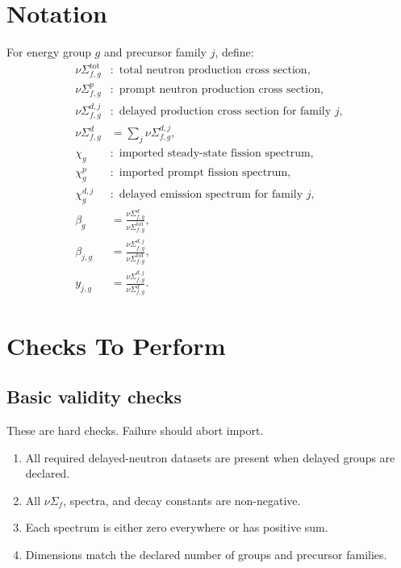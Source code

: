 \documentclass[11pt]{article}
\begin{document}
\section{Notation}

For energy group \(g\) and precursor family \(j\), define:
\begin{align}
  \nu \Sigma_{f,g}^{\mathrm{tot}} &: \text{ total neutron production cross section}, \\
  \nu \Sigma_{f,g}^{p} &: \text{ prompt neutron production cross section}, \\
  \nu \Sigma_{f,g}^{d,j} &: \text{ delayed production cross section for family } j, \\
  \nu \Sigma_{f,g}^{d} &= \sum_j \nu \Sigma_{f,g}^{d,j}, \\
  \chi_g &: \text{ imported steady-state fission spectrum}, \\
  \chi^p_g &: \text{ imported prompt fission spectrum}, \\
  \chi^{d,j}_g &: \text{ delayed emission spectrum for family } j, \\
  \beta_g &= \frac{\nu \Sigma_{f,g}^{d}}{\nu \Sigma_{f,g}^{\mathrm{tot}}}, \\
  \beta_{j,g} &= \frac{\nu \Sigma_{f,g}^{d,j}}{\nu \Sigma_{f,g}^{\mathrm{tot}}}, \\
  y_{j,g} &= \frac{\nu \Sigma_{f,g}^{d,j}}{\nu \Sigma_{f,g}^{d}}.
\end{align}

\section{Checks To Perform}

\subsection{Basic validity checks}

These are hard checks. Failure should abort import.
\begin{enumerate}[label=\arabic*.]
  \item All required delayed-neutron datasets are present when delayed groups are declared.
  \item All \(\nu \Sigma_f\), spectra, and decay constants are non-negative.
  \item Each spectrum is either zero everywhere or has positive sum.
  \item Dimensions match the declared number of groups and precursor families.
\end{enumerate}
\end{document}
